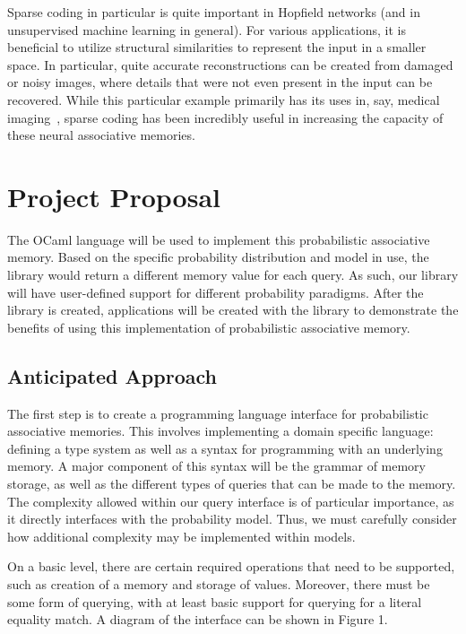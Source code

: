 \documentclass{sig-alternate}
\begin{document}
Sparse coding in particular is quite important in Hopfield networks (and in unsupervised
machine learning in general). For various applications, it is beneficial to utilize
structural similarities to represent the input in a smaller space. In particular, quite 
accurate reconstructions can be created from damaged or noisy images, where details that were 
not even present in the input can be recovered. While this particular example primarily has its uses in, say, 
medical imaging~\cite{yang}, sparse coding has been incredibly useful in increasing the
capacity of these neural associative memories. 


\section{Project Proposal}
\label{sec:project_proposal}
The OCaml language will be used to implement this probabilistic associative memory. 
Based on the specific probability distribution and model in use, the library would return 
a different memory value for each query.
As such, our library will have user-defined support for different probability paradigms. 
After the library is created, applications will be created with the library to demonstrate the benefits of using this implementation
of probabilistic associative memory.

\subsection{Anticipated Approach}
\label{subsec:approach}

The first step is to create a programming language interface for probabilistic
associative memories. This involves implementing a domain specific language: 
defining a type system as well as a syntax for programming with an underlying memory.
A major component of this syntax will be the grammar of memory storage, 
as well as the different types of queries that can be made to the memory. The complexity allowed
within our query interface is of particular importance, as it directly
interfaces with the probability model. Thus, we must carefully consider 
how additional complexity may be implemented within models. 

On a basic level, there are certain required operations that need to be 
supported, such as creation of a memory and storage of values. Moreover,
there must be some form of querying, with at least basic support for querying
for a literal equality match. A diagram of the interface can be shown in Figure 1.
\end{document}
